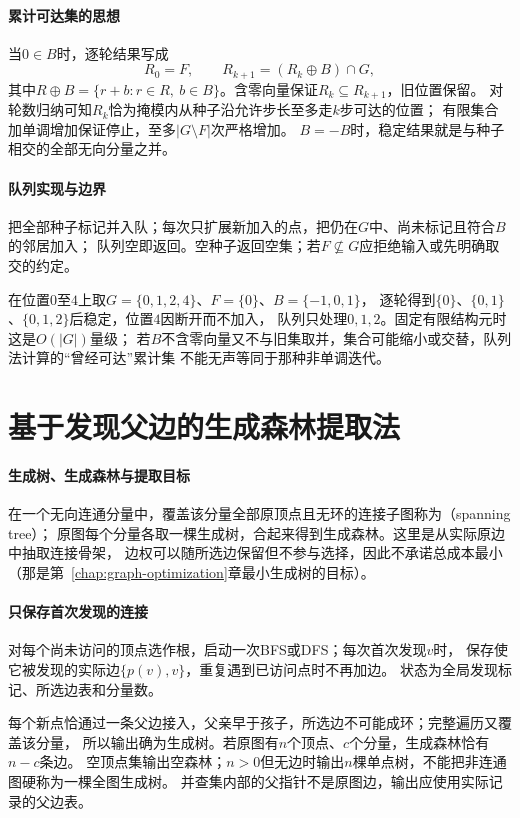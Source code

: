 \paragraph{累计可达集的思想}
当$0\in B$时，逐轮结果写成
\begin{equation}
  R_0=F,\qquad R_{k+1}=(R_k\oplus B)\cap G,
  \label{eq:graph-mask-reconstruction}
\end{equation}
其中$R\oplus B=\{r+b:r\in R,\ b\in B\}$。含零向量保证$R_k\subseteq R_{k+1}$，旧位置保留。
对轮数归纳可知$R_k$恰为掩模内从种子沿允许步长至多走$k$步可达的位置；
有限集合加单调增加保证停止，至多$|G\setminus F|$次严格增加。
$B=-B$时，稳定结果就是与种子相交的全部无向分量之并。

\paragraph{队列实现与边界}
\begin{algorithm}[种子队列掩模重建]
  把全部种子标记并入队；每次只扩展新加入的点，把仍在$G$中、尚未标记且符合$B$的邻居加入；
  队列空即返回。空种子返回空集；若$F\not\subseteq G$应拒绝输入或先明确取交的约定。
\end{algorithm}
在位置$0$至$4$上取$G=\{0,1,2,4\}$、$F=\{0\}$、$B=\{-1,0,1\}$，
逐轮得到$\{0\}$、$\{0,1\}$、$\{0,1,2\}$后稳定，位置$4$因断开而不加入，
队列只处理$0,1,2$。固定有限结构元时这是$O(|G|)$量级；
若$B$不含零向量又不与旧集取并，集合可能缩小或交替，队列法计算的“曾经可达”累计集
不能无声等同于那种非单调迭代。

\section{基于发现父边的生成森林提取法}
\label{sec:graph-theory-spanning-skeleton}

\paragraph{生成树、生成森林与提取目标}
在一个无向连通分量中，覆盖该分量全部原顶点且无环的连接子图称为（spanning tree）；
原图每个分量各取一棵生成树，合起来得到生成森林。这里是从实际原边中抽取连接骨架，
边权可以随所选边保留但不参与选择，因此不承诺总成本最小（那是第~\ref{chap:graph-optimization}章最小生成树的目标）。

\paragraph{只保存首次发现的连接}
\begin{algorithm}[发现父边抽取生成森林]
  对每个尚未访问的顶点选作根，启动一次BFS或DFS；每次首次发现$v$时，
  保存使它被发现的实际边$\{p(v),v\}$，重复遇到已访问点时不再加边。
  状态为全局发现标记、所选边表和分量数。
\end{algorithm}
每个新点恰通过一条父边接入，父亲早于孩子，所选边不可能成环；完整遍历又覆盖该分量，
所以输出确为生成树。若原图有$n$个顶点、$c$个分量，生成森林恰有$n-c$条边。
空顶点集输出空森林；$n>0$但无边时输出$n$棵单点树，不能把非连通图硬称为一棵全图生成树。
并查集内部的父指针不是原图边，输出应使用实际记录的父边表。

